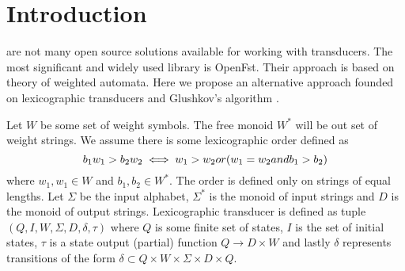 \documentclass[journal]{journal}
\begin{document}
	
	
	\section{Introduction}
 are not many open source solutions available for working with transducers. The most significant and widely used library is OpenFst. Their approach is based on theory of weighted automata\cite{MOHRI3}\cite{DROSTE}\cite{DROSTE2}. Here we propose an alternative approach founded on lexicographic transducers \cite{MendozaDrosik2020MultitapeAA} and Glushkov's algorithm \cite{GLUSHKOV}.


Let $W$ be some set of weight symbols. The free monoid $W^*$ will be out set of weight strings. We assume there is some lexicographic order defined as
\[
b_1w_1 > b_2w_2 \iff w_1 > w_2 \mbox{ or }( w_1=w_2\mbox{ and } b_1 > b_2) \\
\]
where $w_1,w_1\in W$ and $b_1,b_2\in W^*$.  The order is defined only on strings of equal lengths.
Let $\Sigma$ be the input alphabet, $\Sigma^*$ is the monoid of input strings and $D$ is the monoid of output strings.  Lexicographic transducer is defined as tuple $(Q,I,W,\Sigma,D,\delta,\tau)$ where $Q$ is some finite set of states, $I$ is the set of initial states, $\tau$ is a state output (partial) function $Q\rightarrow D \times W$ and lastly $\delta$ represents transitions of the form $\delta \subset Q \times W \times \Sigma \times D \times Q$.
\end{document}
